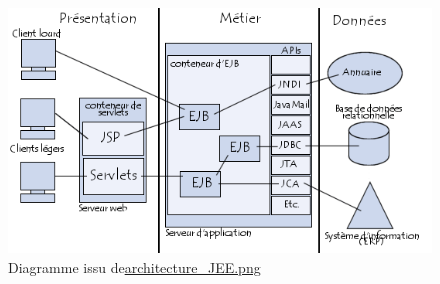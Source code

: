 \begin{figure}[!h]
    \center
   	\includegraphics[scale=0.65]{architecture_JEE.png}
   	\caption{Diagramme issu de\url{architecture_JEE.png}}
    \label{reference1}
\end{figure}


